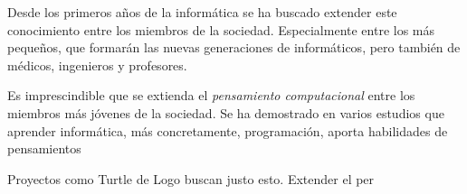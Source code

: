 Desde los primeros años de la informática se ha buscado extender este conocimiento entre los miembros de la sociedad. Especialmente entre los más pequeños, que formarán las nuevas generaciones de informáticos, pero también de médicos, ingenieros y profesores. 

Es imprescindible que se extienda el \emph{pensamiento computacional} entre los miembros más jóvenes de la sociedad. Se ha demostrado en varios estudios que aprender informática, más concretamente, programación, aporta habilidades de pensamientos

Proyectos como Turtle de Logo buscan justo esto. Extender el per





























